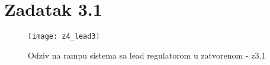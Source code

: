 \chapter{Zadatak 3.1}

\begin{figure} [H]
  \centering
  \texttt{[image: z4\_lead3]}
  \caption{Odziv na rampu sistema sa lead regulatorom u zatvorenom - z3.1}
  \label{fig:z4_lead3}
\end{figure}


